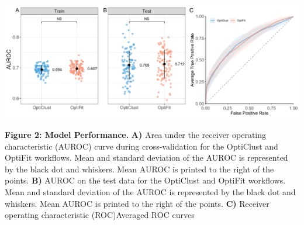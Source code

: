 \documentclass[
]{article}
\begin{document}
\newpage

\includegraphics{../exploratory/figures/figure2.pdf}

\textbf{Figure 2: Model Performance.} \textbf{A)} Area under the
receiver operating characteristic (AUROC) curve during cross-validation
for the OptiClust and OptiFit workflows. Mean and standard deviation of
the AUROC is represented by the black dot and whiskers. Mean AUROC is
printed to the right of the points. \textbf{B)} AUROC on the test data
for the OptiClust and OptiFit workflows. Mean and standard deviation of
the AUROC is represented by the black dot and whiskers. Mean AUROC is
printed to the right of the points. \textbf{C)} Receiver operating
characteristic (ROC)Averaged ROC curves
\end{document}
